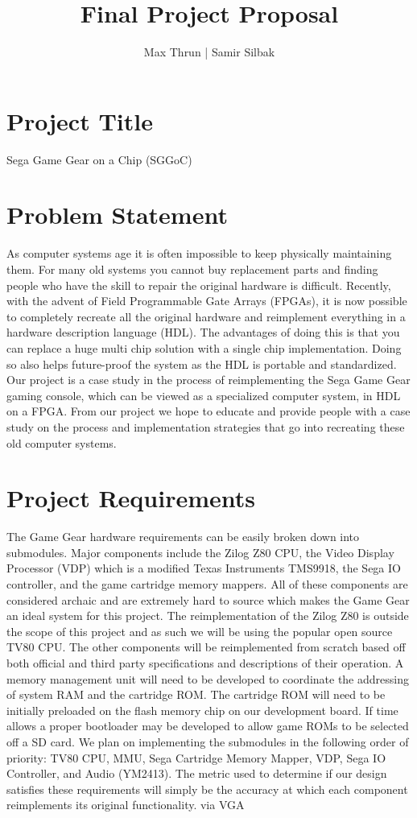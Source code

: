 \documentclass[11pt]{article}
\title{Final Project Proposal}
\author{ Max Thrun | Samir Silbak }
\begin{document}
\maketitle

\section*{Project Title}
Sega Game Gear on a Chip (SGGoC)

\section*{Problem Statement}
As computer systems age it is often impossible to keep physically maintaining them.
For many old systems you cannot buy replacement parts and finding people who have the skill
to repair the original hardware is difficult. Recently, with the advent of Field Programmable
Gate Arrays (FPGAs), it is now possible to completely recreate all the original hardware and reimplement
everything in a hardware description language (HDL). The advantages of doing this is that you can
replace a huge multi chip solution with a single chip implementation. Doing so also helps future-proof
the system as the HDL is portable and standardized. Our project is a case study in the process of
reimplementing the Sega Game Gear gaming console, which can be viewed as a specialized computer system, in HDL on a FPGA.
From our project we hope to educate and provide people with a case study on the process and implementation 
strategies that go into recreating these old computer systems.

\section*{Project Requirements}
The Game Gear hardware requirements can be easily broken down into submodules. Major components include the Zilog Z80 CPU, 
the Video Display Processor (VDP) which is a modified Texas Instruments TMS9918, the Sega IO controller, and the
game cartridge memory mappers. All of these components are considered archaic and are extremely hard to source which makes
the Game Gear an ideal system for this project. The reimplementation of the Zilog Z80 is outside the scope of this project and as such
we will be using the popular open source TV80 CPU. The other components will be reimplemented from scratch based off both official and 
third party specifications and descriptions of their operation. A memory management unit will need to be developed to coordinate the 
addressing of system RAM and the cartridge ROM. The cartridge ROM will need to be initially preloaded on the flash memory chip on
our development board. If time allows a proper bootloader may be developed to allow game ROMs to be selected off a
SD card. We plan on implementing the submodules in the following order of priority: TV80 CPU, MMU, Sega Cartridge Memory Mapper, VDP,
Sega IO Controller, and Audio (YM2413). The metric used to determine if our design satisfies these requirements will simply
be the accuracy at which each component reimplements its original functionality.
via VGA 
\end{document}
